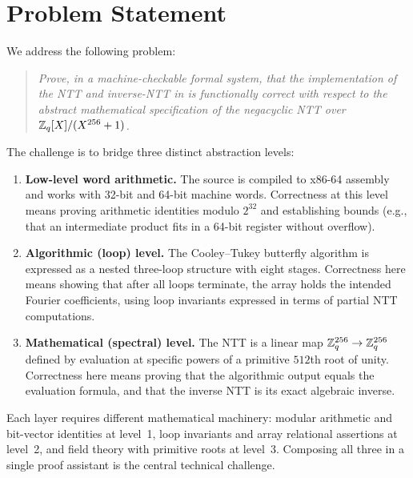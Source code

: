 \section{Problem Statement}

We address the following problem:

\begin{quote}
  \textit{Prove, in a machine-checkable formal system, that the \jasmin{}
  implementation of the NTT and inverse-NTT in \haetae{} is functionally
  correct with respect to the abstract mathematical specification of the
  negacyclic NTT over $\mathbb{Z}_q[X]/(X^{256}+1)$.}
\end{quote}

The challenge is to bridge three distinct abstraction levels:

\begin{enumerate}
  \item \textbf{Low-level word arithmetic.}  The \jasmin{} source is compiled
        to x86-64 assembly and works with 32-bit and 64-bit machine words.
        Correctness at this level means proving arithmetic identities modulo
        $2^{32}$ and establishing bounds (e.g., that an intermediate product
        fits in a 64-bit register without overflow).

  \item \textbf{Algorithmic (loop) level.}  The Cooley--Tukey butterfly
        algorithm is expressed as a nested three-loop structure with eight
        stages.  Correctness here means showing that after all loops terminate,
        the array holds the intended Fourier coefficients, using loop invariants
        expressed in terms of partial NTT computations.

  \item \textbf{Mathematical (spectral) level.}  The NTT is a linear map
        $\mathbb{Z}_q^{256} \to \mathbb{Z}_q^{256}$ defined by evaluation at specific powers
        of a primitive $512$th root of unity.  Correctness here means proving
        that the algorithmic output equals the evaluation formula, and that the
        inverse NTT is its exact algebraic inverse.
\end{enumerate}

Each layer requires different mathematical machinery: modular arithmetic
and bit-vector identities at level~1, loop invariants and array
relational assertions at level~2, and field theory with primitive roots at
level~3.  Composing all three in a single proof assistant is the central
technical challenge.

